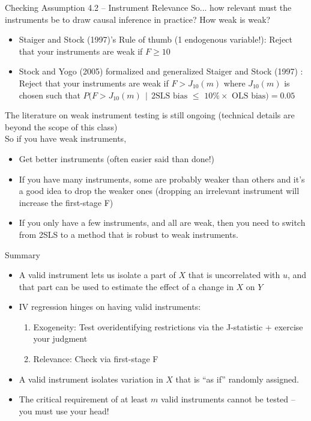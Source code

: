 \documentclass[notes,10pt, aspectratio=169]{beamer}
\begin{document}
\begin{frame}{Checking Assumption 4.2 -- Instrument Relevance}
So... how relevant must the instruments be to draw causal inference in practice? How weak is weak?

\begin{itemize}
    \item Staiger and Stock (1997)’s Rule of thumb (1 endogenous variable!): Reject that your instruments are weak if $F\geq10$
    \item Stock and Yogo (2005) formalized and generalized Staiger and Stock (1997) : Reject that your instruments are weak if $F > J_{10}(m)$ where $J_{10}(m)$ is chosen such that $P(F > J_{10}(m) ~~|~~ \text{2SLS bias $\leq$ 10\% $\times$ OLS bias)}= 0.05$

\end{itemize}
\vspace{1em}

The literature on weak instrument testing is still ongoing (technical details are beyond the scope of this class)\\[1em]

So if you have weak instruments,
\begin{itemize}
    \item Get better instruments (often easier said than done!)
    \item If you have many instruments, some are probably weaker than others and it’s a good idea to drop the weaker ones (dropping an irrelevant instrument will increase the first-stage F)
    \item If you only have a few instruments, and all are weak, then you need to switch from 2SLS to a method that is robust to weak instruments.
\end{itemize}
\end{frame}

\begin{frame}{Summary}
\begin{itemize}
    \item A valid instrument lets us isolate a part of $X$ that is uncorrelated with $u$, and that part can be used to estimate the effect of a change in $X$ on $Y$
    \vspace{1em}
    \item IV regression hinges on having valid instruments:
    \begin{enumerate}
        \item Exogeneity: Test overidentifying restrictions via the J-statistic + exercise your judgment 
        \item Relevance: Check via first-stage F
    \end{enumerate}
    \vspace{1em}
    \item A valid instrument isolates variation in $X$ that is ``as if'' randomly assigned.
    \vspace{1em}
    \item The critical requirement of at least $m$ valid instruments cannot be tested -- you must use your head!
\end{itemize}
\end{frame}
\end{document}
